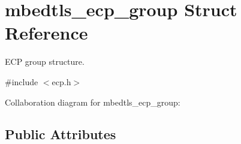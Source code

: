 \hypertarget{structmbedtls__ecp__group}{}\section{mbedtls\+\_\+ecp\+\_\+group Struct Reference}
\label{structmbedtls__ecp__group}


E\+CP group structure.  




{\ttfamily \#include $<$ecp.\+h$>$}



Collaboration diagram for mbedtls\+\_\+ecp\+\_\+group\+:
\subsection*{Public Attributes}
